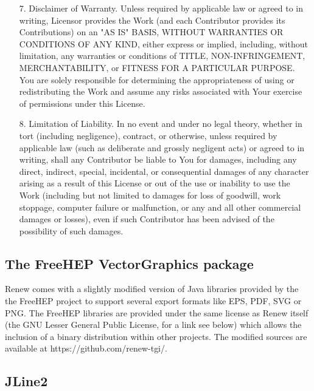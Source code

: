 \begin{licensequote}
\begin{itemize}
      \dots

  \item[7.]
      Disclaimer of Warranty. Unless required by applicable law or
      agreed to in writing, Licensor provides the Work (and each
      Contributor provides its Contributions) on an "AS IS" BASIS,
      WITHOUT WARRANTIES OR CONDITIONS OF ANY KIND, either express or
      implied, including, without limitation, any warranties or conditions
      of TITLE, NON-INFRINGEMENT, MERCHANTABILITY, or FITNESS FOR A
      PARTICULAR PURPOSE. You are solely responsible for determining the
      appropriateness of using or redistributing the Work and assume any
      risks associated with Your exercise of permissions under this License.

  \item[8.]
      Limitation of Liability. In no event and under no legal theory,
      whether in tort (including negligence), contract, or otherwise,
      unless required by applicable law (such as deliberate and grossly
      negligent acts) or agreed to in writing, shall any Contributor be
      liable to You for damages, including any direct, indirect, special,
      incidental, or consequential damages of any character arising as a
      result of this License or out of the use or inability to use the
      Work (including but not limited to damages for loss of goodwill,
      work stoppage, computer failure or malfunction, or any and all
      other commercial damages or losses), even if such Contributor
      has been advised of the possibility of such damages.
  \end{itemize}
\end{licensequote}


\subsection{The FreeHEP VectorGraphics package}

Renew comes with a slightly modified version of Java libraries
provided by the the FreeHEP project to support several export formats
like EPS, PDF, SVG or PNG.  The FreeHEP libraries are provided under
the same license as Renew itself (the GNU Lesser General Public
License, for a link see below) which allows the inclusion of a binary
distribution within other projects.  The modified sources are
available at https://github.com/renew-tgi/.

\subsection{JLine2}

